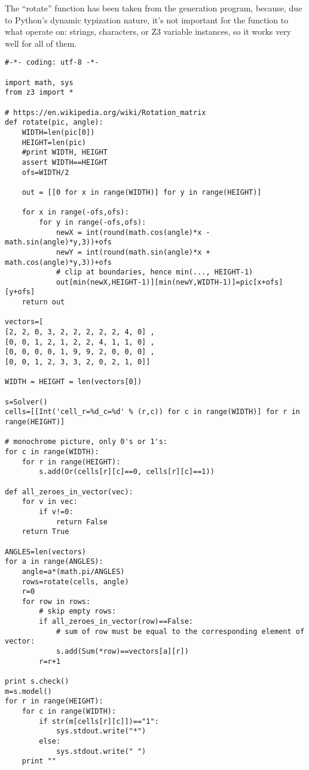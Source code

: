 The ``rotate'' function has been taken from the generation program, because, due to Python's dynamic typization nature,
it's not important for the function to what operate on:
strings, characters, or Z3 variable instances, so it works very well for all of them.

\begin{lstlisting}
#-*- coding: utf-8 -*-

import math, sys
from z3 import *

# https://en.wikipedia.org/wiki/Rotation_matrix
def rotate(pic, angle):
    WIDTH=len(pic[0])
    HEIGHT=len(pic)
    #print WIDTH, HEIGHT
    assert WIDTH==HEIGHT
    ofs=WIDTH/2

    out = [[0 for x in range(WIDTH)] for y in range(HEIGHT)]

    for x in range(-ofs,ofs):
        for y in range(-ofs,ofs):
            newX = int(round(math.cos(angle)*x - math.sin(angle)*y,3))+ofs
            newY = int(round(math.sin(angle)*x + math.cos(angle)*y,3))+ofs
            # clip at boundaries, hence min(..., HEIGHT-1)
            out[min(newX,HEIGHT-1)][min(newY,WIDTH-1)]=pic[x+ofs][y+ofs]
    return out

vectors=[
[2, 2, 0, 3, 2, 2, 2, 2, 2, 4, 0] ,
[0, 0, 1, 2, 1, 2, 2, 4, 1, 1, 0] ,
[0, 0, 0, 0, 1, 9, 9, 2, 0, 0, 0] ,
[0, 0, 1, 2, 3, 3, 2, 0, 2, 1, 0]]

WIDTH = HEIGHT = len(vectors[0])

s=Solver()
cells=[[Int('cell_r=%d_c=%d' % (r,c)) for c in range(WIDTH)] for r in range(HEIGHT)]

# monochrome picture, only 0's or 1's:
for c in range(WIDTH):
    for r in range(HEIGHT):
        s.add(Or(cells[r][c]==0, cells[r][c]==1))

def all_zeroes_in_vector(vec):
    for v in vec:
        if v!=0:
            return False
    return True

ANGLES=len(vectors)
for a in range(ANGLES):
    angle=a*(math.pi/ANGLES)
    rows=rotate(cells, angle)
    r=0
    for row in rows:
        # skip empty rows:
        if all_zeroes_in_vector(row)==False:
            # sum of row must be equal to the corresponding element of vector:
            s.add(Sum(*row)==vectors[a][r])
        r=r+1

print s.check()
m=s.model()
for r in range(HEIGHT):
    for c in range(WIDTH):
        if str(m[cells[r][c]])=="1":
            sys.stdout.write("*")
        else:
            sys.stdout.write(" ")
    print ""
\end{lstlisting}

